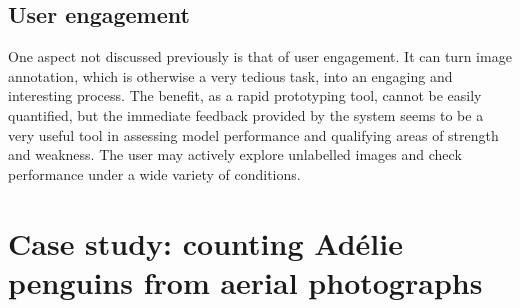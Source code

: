 \subsection{User engagement}
\label{sec:engagement}

One aspect not discussed previously is that of user engagement. It can turn image annotation, which is otherwise a very tedious task, into an engaging and interesting process. The benefit, as a rapid prototyping tool, cannot be easily quantified, but the immediate feedback provided by the system seems to be a very useful tool in assessing model performance and qualifying areas of strength and weakness. The user may actively explore unlabelled images and check performance under a wide variety of conditions.


\section{Case study: counting Ad\'elie penguins from aerial photographs}
\label{sec:case_penguins}

